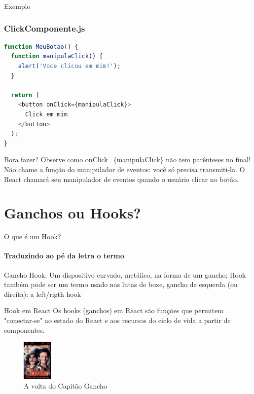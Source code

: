 \documentclass[13pt, xcolor={dvipsnames,svgnames}, portuguese]{beamer}
\begin{document}
\begin{frame}[fragile]{Exemplo}
\frametitle{ClickComponente.js}
\begin{lstlisting}[language=JavaScript]
function MeuBotao() {
  function manipulaClick() {
    alert('Voce clicou em mim!');
  }

  return (
    <button onClick={manipulaClick}>
      Click em mim
    </button>
  );
}
\end{lstlisting}

\begin{alertblock}{Bora fazer?}
	Observe como onClick=\{manipulaClick\} não tem parênteses no final! Não chame a função do manipulador de eventos: você só precisa transmiti-la. O React chamará seu manipulador de eventos quando o usuário clicar no botão.
\end{alertblock}
\end{frame}

\section{Ganchos ou Hooks?}
\begin{frame}{O que é um Hook?}
\framesubtitle{Traduzindo ao pé da letra o termo}
	\begin{block}{Gancho}
       Hook: Um dispositivo curvado, metálico, na forma de um gancho;
       Hook também pode ser um termo usado nas lutas de boxe, gancho de esquerda (ou direita): a left/rigth hook
	\end{block}
\pause
	\begin{block}{Hook em React}
       Os hooks (ganchos) em React são funções que permitem "conectar-se" ao estado do React e aos recursos do ciclo de vida a partir de componentes.
	\end{block}
\pause
\begin{figure}
\includegraphics[width=0.13\textwidth]{Figuras/hookCaptain.png}
\caption{A volta do Capitão Gancho}
\end{figure}
\end{frame}
\end{document}
